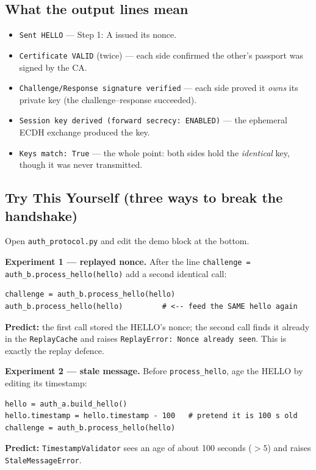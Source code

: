 \documentclass[11pt,a4paper]{article}
\begin{document}
\subsection{What the output lines mean}
\begin{itemize}
  \item \texttt{Sent HELLO} --- Step 1: A issued its nonce.
  \item \texttt{Certificate VALID} (twice) --- each side confirmed the other's
        passport was signed by the CA.
  \item \texttt{Challenge/Response signature verified} --- each side proved it
        \emph{owns} its private key (the challenge--response succeeded).
  \item \texttt{Session key derived (forward secrecy: ENABLED)} --- the ephemeral
        ECDH exchange produced the key.
  \item \texttt{Keys match: True} --- the whole point: both sides hold the
        \emph{identical} key, though it was never transmitted.
\end{itemize}

\subsection{Try This Yourself (three ways to break the handshake)}
Open \texttt{auth\_protocol.py} and edit the demo block at the bottom.

\textbf{Experiment 1 --- replayed nonce.} After the line
\texttt{challenge = auth\_b.process\_hello(hello)} add a second identical call:
\begin{lstlisting}[style=term]
challenge = auth_b.process_hello(hello)
auth_b.process_hello(hello)         # <-- feed the SAME hello again
\end{lstlisting}
\textbf{Predict:} the first call stored the HELLO's nonce; the second call finds
it already in the \texttt{ReplayCache} and raises \texttt{ReplayError: Nonce
already seen}. This is exactly the replay defence.

\textbf{Experiment 2 --- stale message.} Before \texttt{process\_hello}, age the
HELLO by editing its timestamp:
\begin{lstlisting}[style=term]
hello = auth_a.build_hello()
hello.timestamp = hello.timestamp - 100   # pretend it is 100 s old
challenge = auth_b.process_hello(hello)
\end{lstlisting}
\textbf{Predict:} \texttt{TimestampValidator} sees an age of about 100 seconds
($> 5$) and raises \texttt{StaleMessageError}.
\end{document}
